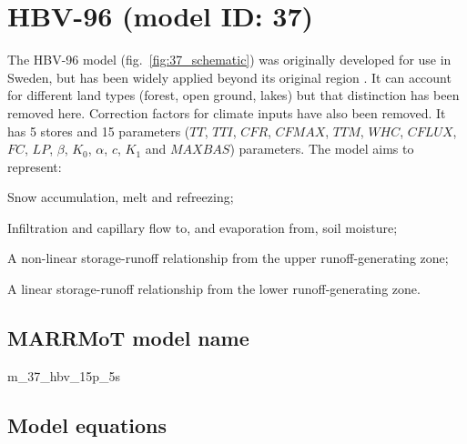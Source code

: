 \section{HBV-96 (model ID: 37)}
The HBV-96 model (fig.~\ref{fig:37_schematic}) was originally developed for use in Sweden, but has been widely applied beyond its original region \citep{Lindstrom1997}. It can account for different land types (forest, open ground, lakes) but that distinction has been removed here. Correction factors for climate inputs have also been removed. It has 5 stores and 15 parameters ($TT$, $TTI$, $CFR$, $CFMAX$, $TTM$, $WHC$, $CFLUX$, $FC$, $LP$, $\beta$, $K_0$, $\alpha$, $c$, $K_1$ and $MAXBAS$) parameters. The model aims to represent:

\begin{itemizecompact}
\item Snow accumulation, melt and refreezing;
\item Infiltration and capillary flow to, and evaporation from, soil moisture;
\item A non-linear storage-runoff relationship from the upper runoff-generating zone;
\item A linear storage-runoff relationship from the lower runoff-generating zone.
\end{itemizecompact}

\subsection{MARRMoT model name}
m\_37\_hbv\_15p\_5s \\

\subsection{Model equations}

